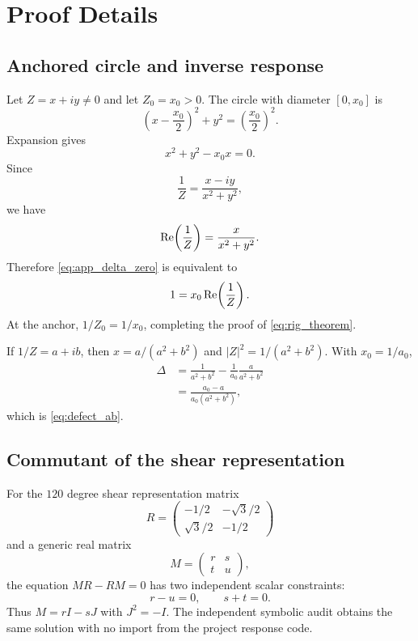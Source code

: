 \chapter{Proof Details}\label{app:proofs}

\section{Anchored circle and inverse response}
Let $Z=x+iy\ne0$ and let $Z_0=x_0>0$. The circle with diameter $[0,x_0]$ is
\begin{equation}
 \left(x-\frac{x_0}{2}\right)^2+y^2=\left(\frac{x_0}{2}\right)^2.
 \label{eq:app_circle}
\end{equation}
Expansion gives
\begin{equation}
 x^2+y^2-x_0x=0.
 \label{eq:app_delta_zero}
\end{equation}
Since
\begin{equation}
 \frac1Z=\frac{x-iy}{x^2+y^2},
 \label{eq:app_inverse}
\end{equation}
we have
\begin{equation}
 \operatorname{Re}\!\left(\frac1Z\right)=\frac{x}{x^2+y^2}.
 \label{eq:app_inverse_real}
\end{equation}
Therefore \cref{eq:app_delta_zero} is equivalent to
\begin{equation}
 1=x_0\operatorname{Re}\!\left(\frac1Z\right).
 \label{eq:app_classifier}
\end{equation}
At the anchor, $1/Z_0=1/x_0$, completing the proof of \cref{eq:rig_theorem}.

If $1/Z=a+ib$, then $x=a/(a^2+b^2)$ and $|Z|^2=1/(a^2+b^2)$. With $x_0=1/a_0$,
\begin{align}
 \Delta
 &=\frac1{a^2+b^2}
 -\frac1{a_0}\frac{a}{a^2+b^2}\\
 &=\frac{a_0-a}{a_0(a^2+b^2)},
\end{align}
which is \cref{eq:defect_ab}.

\section{Commutant of the shear representation}
For the $120$ degree shear representation matrix
\begin{equation}
 R=\begin{pmatrix}
 -1/2&-\sqrt3/2\\
 \sqrt3/2&-1/2
 \end{pmatrix}
\end{equation}
and a generic real matrix
\begin{equation}
 M=\begin{pmatrix}r&s\\t&u\end{pmatrix},
\end{equation}
the equation $MR-RM=0$ has two independent scalar constraints:
\begin{equation}
 r-u=0,
 \qquad
 s+t=0.
\end{equation}
Thus $M=rI-sJ$ with $J^2=-I$. The independent symbolic audit obtains the same solution with no import from the project response code.

